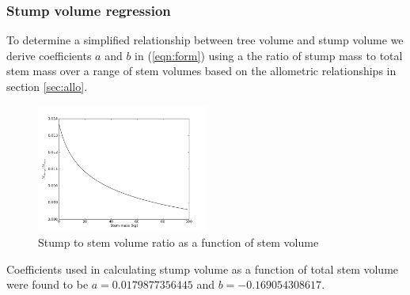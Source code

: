 \subsubsection*{Stump volume regression}
To determine a simplified relationship between tree volume and stump volume we derive coefficients $a$ and $b$ in (\ref{eqn:form}) using a the ratio of stump mass to total stem mass over a range of stem volumes based on the allometric relationships in section \ref{sec:allo}.\begin{figure}[h]
     \centering
    \includegraphics[width=0.5\textwidth]{nlm_stump.png}
    \caption{Stump to stem volume ratio as a function of stem volume}
    \label{fig:stump_vol}
    \end{figure}
Coefficients used in calculating stump volume as a function of total stem volume were found to be $a=0.0179877356445$ and $b=-0.169054308617$.